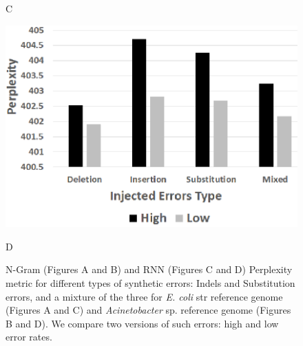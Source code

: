 \begin{figure}[t]
\begin{minipage}[t]{1.0\textwidth}
\begin{minipage}[t]{.24\textwidth}
  \caption{C}
\end{minipage}
\begin{minipage}[t]{.24\textwidth}
\centering
  \includegraphics[width=\linewidth]{figs/Synth_RNN_3.eps}
  \caption{D}
\end{minipage}
\end{minipage}
  \caption{N-Gram (Figures A and B) and RNN (Figures C and D)  Perplexity metric for different types of synthetic errors: Indels and Substitution errors, and a mixture of the three for \textit{E. coli} str reference genome (Figures A and C) and \textit{Acinetobacter} sp. reference genome (Figures B and D). We compare two versions of such errors: high and low error rates.}
\label{figure:Synthetic_Errors_Detection}
\end{figure}


  

